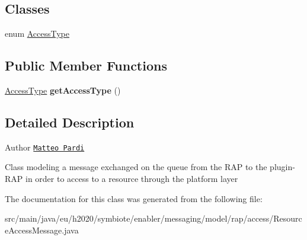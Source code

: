 \subsection*{Classes}
\begin{DoxyCompactItemize}
\item 
enum \hyperlink{enumeu_1_1h2020_1_1symbiote_1_1enabler_1_1messaging_1_1model_1_1rap_1_1access_1_1ResourceAccessMessage_1_1AccessType}{Access\+Type}
\end{DoxyCompactItemize}
\subsection*{Public Member Functions}
\begin{DoxyCompactItemize}
\item 
\mbox{\label{classeu_1_1h2020_1_1symbiote_1_1enabler_1_1messaging_1_1model_1_1rap_1_1access_1_1ResourceAccessMessage_a731afc1241a1bb605b1d75874b9b1941}} 
\hyperlink{enumeu_1_1h2020_1_1symbiote_1_1enabler_1_1messaging_1_1model_1_1rap_1_1access_1_1ResourceAccessMessage_1_1AccessType}{Access\+Type} {\bfseries get\+Access\+Type} ()
\end{DoxyCompactItemize}


\subsection{Detailed Description}
\begin{DoxyAuthor}{Author}
\href{mailto:m.pardi@nextworks.it}{\tt Matteo Pardi}
\end{DoxyAuthor}
Class modeling a message exchanged on the queue from the R\+AP to the plugin-\/\+R\+AP in order to access to a resource through the platform layer 

The documentation for this class was generated from the following file\+:\begin{DoxyCompactItemize}
\item 
src/main/java/eu/h2020/symbiote/enabler/messaging/model/rap/access/Resource\+Access\+Message.\+java\end{DoxyCompactItemize}
